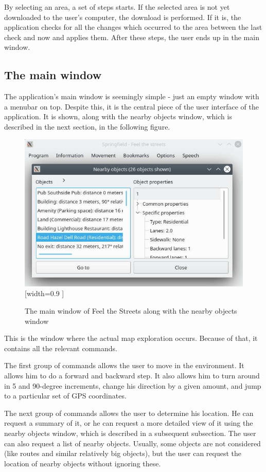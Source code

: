 \documentclass[nolof,digital]{fithesis3}
\begin{document}
By selecting an area, a set of steps starts. If the selected area is not yet downloaded to the user's computer, the download is performed. If it is, the application checks for all the changes which occurred to the area between the last check and now and applies them. After these steps, the user ends up in the main window.
\subsection{The main window}

The application's main window is seemingly simple - just an empty window with a menubar on top. Despite this, it is the central piece of the user interface of the application. It is shown, along with the nearby objects window, which is described in the next section, in the following figure.
\begin{figure}[h]
\caption{The main window of Feel the Streets along with the nearby objects window}
\includegraphics{feel-the-streets}[width=0.9 \textwidth]
\label{fig:fts}
\end{figure}

This is the window where the actual map exploration occurs. Because of that, it contains all the relevant commands.

The first group of commands allows the user to move in the environment. It allows him to do a forward and backward step. It also allows him to turn around in 5 and 90-degree increments, change his direction by a given amount, and jump to a particular set of GPS coordinates.

The next group of commands allows the user to determine his location. He can request a summary of it, or he can request a more detailed view of it using the nearby objects window, which is described in a subsequent subsection. The user can also request a list of nearby objects. Usually, some objects are not considered (like routes and similar relatively big objects), but the user can request the location of nearby objects without ignoring these.
\end{document}
